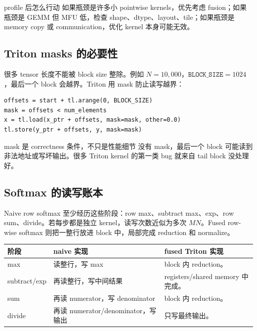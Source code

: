 \begin{knowledgebox}{profile 后怎么行动}
如果瓶颈是许多小 pointwise kernels，优先考虑 fusion；如果瓶颈是 GEMM 但 MFU 低，检查 shape、dtype、layout、tile；如果瓶颈是 memory copy 或 communication，优化 kernel 本身可能无效。
\end{knowledgebox}

\subsection{Triton masks 的必要性}

很多 tensor 长度不能被 block size 整除。例如 \(N=10{,}000\)，\(\texttt{BLOCK\_SIZE}=1024\)，最后一个 block 会越界。Triton 用 mask 防止读写越界：

\begin{lstlisting}[caption={mask 保护尾部 block}]
offsets = start + tl.arange(0, BLOCK_SIZE)
mask = offsets < num_elements
x = tl.load(x_ptr + offsets, mask=mask, other=0.0)
tl.store(y_ptr + offsets, y, mask=mask)
\end{lstlisting}

\begin{warningbox}{mask 是 correctness 条件，不只是性能细节}
没有 mask，最后一个 block 可能读到非法地址或写坏输出。很多 Triton kernel 的第一类 bug 就来自 tail block 没处理好。
\end{warningbox}

\subsection{Softmax 的读写账本}

Naive row softmax 至少经历这些阶段：row max、subtract max、exp、row sum、divide。若每步都是独立 kernel，读写次数近似为多次 \(MN\)。Fused row-wise softmax 则把一整行放进 block 中，局部完成 reduction 和 normalize。

\begin{longtable}{p{}p{}p{}}
\toprule
\textbf{阶段} & \textbf{naive 实现} & \textbf{fused Triton 实现} \\
\midrule
max & 读整行，写 max & block 内 reduction。 \\
subtract/exp & 再读整行，写中间结果 & registers/shared memory 中完成。 \\
sum & 再读 numerator，写 denominator & block 内 reduction。 \\
divide & 再读 numerator/denominator，写输出 & 只写最终输出。 \\
\bottomrule
\end{longtable}

